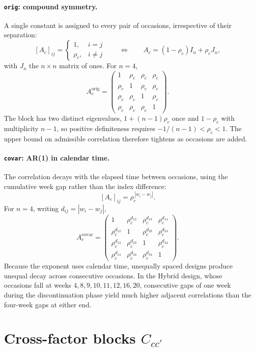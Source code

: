 \documentclass[11pt]{article}
\begin{document}
\paragraph{\texttt{orig}: compound symmetry.}
A single constant is assigned to every pair of occasions, irrespective
of their separation:
\[
[A_c]_{ij} =
\begin{cases}
1, & i = j\\
\rho_c, & i \neq j
\end{cases}
\qquad\Longleftrightarrow\qquad
A_c = (1-\rho_c) I_n + \rho_c J_n ,
\]
with $J_n$ the $n \times n$ matrix of ones. For $n = 4$,
\[
A_c^{\text{orig}} =
\begin{pmatrix}
1 & \rho_c & \rho_c & \rho_c\\
\rho_c & 1 & \rho_c & \rho_c\\
\rho_c & \rho_c & 1 & \rho_c\\
\rho_c & \rho_c & \rho_c & 1
\end{pmatrix}.
\]
The block has two distinct eigenvalues, $1 + (n-1)\rho_c$ once and
$1 - \rho_c$ with multiplicity $n-1$, so positive definiteness
requires $-1/(n-1) < \rho_c < 1$. The upper bound on admissible
correlation therefore tightens as occasions are added.

\paragraph{\texttt{covar}: AR(1) in calendar time.}
The correlation decays with the elapsed time between occasions, using
the cumulative week gap rather than the index difference:
\[
[A_c]_{ij} = \rho_c^{\,|w_i - w_j|}.
\]
For $n = 4$, writing $d_{ij} = |w_i - w_j|$,
\[
A_c^{\text{covar}} =
\begin{pmatrix}
1 & \rho_c^{d_{12}} & \rho_c^{d_{13}} & \rho_c^{d_{14}}\\
\rho_c^{d_{12}} & 1 & \rho_c^{d_{23}} & \rho_c^{d_{24}}\\
\rho_c^{d_{13}} & \rho_c^{d_{23}} & 1 & \rho_c^{d_{34}}\\
\rho_c^{d_{14}} & \rho_c^{d_{24}} & \rho_c^{d_{34}} & 1
\end{pmatrix}.
\]
Because the exponent uses calendar time, unequally spaced designs
produce unequal decay across consecutive occasions. In the Hybrid
design, whose occasions fall at weeks
$4, 8, 9, 10, 11, 12, 16, 20$, consecutive gaps of one week during
the discontinuation phase yield much higher adjacent correlations
than the four-week gaps at either end.

\section{Cross-factor blocks $C_{cc'}$}
\end{document}
